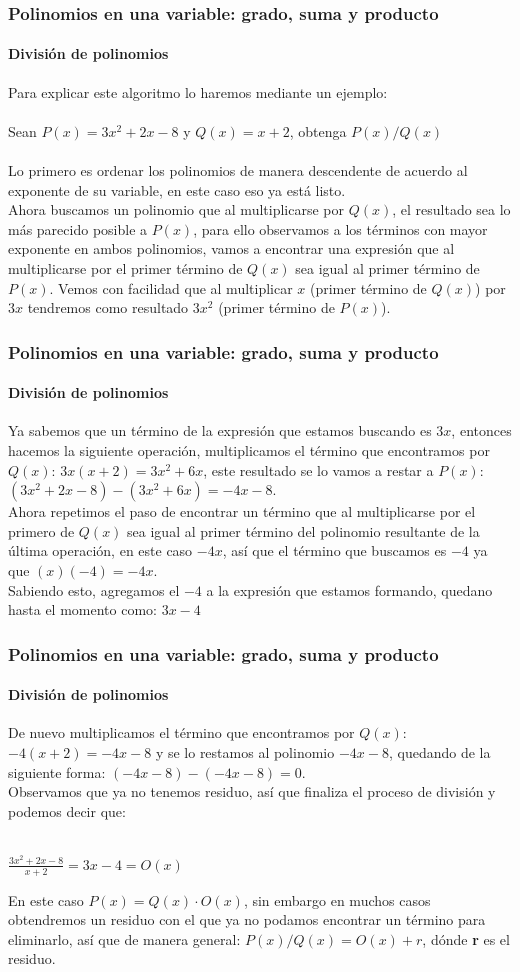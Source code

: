 \documentclass[11pt]{beamer}
\begin{document}
\begin{frame}
\frametitle{Polinomios en una variable: grado, suma y producto}
\framesubtitle{División de polinomios}
Para explicar este algoritmo lo haremos mediante un ejemplo:\\ \hspace{0cm} \\
Sean $P(x) = 3x^2 + 2x - 8$ y $Q(x) = x+2$, obtenga $P(x)/Q(x)$\\ \hspace{0cm} \\
Lo primero es ordenar los polinomios de manera descendente de acuerdo al exponente de su variable, en este caso eso ya está listo.\\
Ahora buscamos un polinomio que al multiplicarse por $Q(x)$, el resultado sea lo más parecido posible a $P(x)$, para ello observamos a los términos con mayor exponente en ambos polinomios, vamos a encontrar una expresión que al multiplicarse por el primer término de $Q(x)$ sea igual al primer término de $P(x)$. Vemos con facilidad que al multiplicar $x$ (primer término de $Q(x)$) por $3x$ tendremos como resultado $3x^2$ (primer término de $P(x)$).
\end{frame}

\begin{frame}
\frametitle{Polinomios en una variable: grado, suma y producto}
\framesubtitle{División de polinomios}
Ya sabemos que un término de la expresión que estamos buscando es $3x$, entonces hacemos la siguiente operación, multiplicamos el término que encontramos por $Q(x)$: $3x(x+2) = 3x^2 + 6x$, este resultado se lo vamos a restar a $P(x)$: $(3x^2 + 2x - 8) - (3x^2 + 6x) = -4x - 8$.\\
Ahora repetimos el paso de encontrar un término que al multiplicarse por el primero de $Q(x)$ sea igual al primer término del polinomio resultante de la última operación, en este caso $-4x$, así que el término que buscamos es $-4$ ya que $(x)(-4) = -4x$.\\
Sabiendo esto, agregamos el $-4$ a la expresión que estamos formando, quedano hasta el momento como: $3x-4$
\end{frame}

\begin{frame}
\frametitle{Polinomios en una variable: grado, suma y producto}
\framesubtitle{División de polinomios}
De nuevo multiplicamos el término que encontramos por $Q(x)$: $-4(x+2) = -4x -8$ y se lo restamos al polinomio $-4x-8$, quedando de la siguiente forma: $(-4x-8)-(-4x-8) = 0$. \\
Observamos que ya no tenemos residuo, así que finaliza el proceso de división y podemos decir que:\\ \hspace{0cm} \\
\begin{center}
$\frac{3x^2 + 2x - 8}{x + 2} = 3x - 4 = O(x)$\\
\end{center}
En este caso $P(x) = Q(x)\cdot O(x)$, sin embargo en muchos casos obtendremos un residuo con el que ya no podamos encontrar un término para eliminarlo, así que de manera general: $P(x)/Q(x) = O(x) + r$, dónde \textbf{r} es el residuo.
\end{frame}
\end{document}
